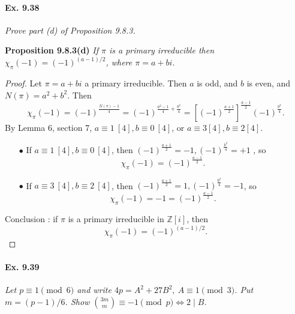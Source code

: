 \documentclass[11pt,a4paper]{article}
\newcommand{\Z}{\mathbb{Z}}
\begin{document}
\paragraph{Ex. 9.38}

{\it Prove part (d) of Proposition 9.8.3.
}

\bigskip

{\bf Proposition 9.8.3(d)} {\it 
If $\pi$ is a primary irreducible then $\chi_{\pi}(-1)=(-1)^{(a-1)/2}$, where $\pi = a+bi$.}



\begin{proof}
Let $\pi = a + bi$ a primary irreducible. Then $a$ is odd, and $b$ is even, and $N(\pi) = a^2+b^2$. 
Then 
$$\chi_\pi(-1) = (-1)^{\frac{N(\pi)-1}{4}} = (-1)^{\frac{a^2-1}{4}+ \frac{b^2}{4}} = [(-1)^{\frac{a+1}{2}}]^{\frac{a-1}{2}} (-1)^{\frac{b^2}{4}}.$$
By Lemma 6, section 7, $a\equiv 1\ [4], b\equiv 0\ [4]$, or $a \equiv 3 [4], b\equiv 2 [4]$.
\begin{enumerate}
	\item[$\bullet$] If $a\equiv 1\ [4], b\equiv 0\ [4]$, then $(-1)^{\frac{a+1}{2}} = -1, (-1)^{\frac{b^2}{4}}=+1$ , so
	$$\chi_\pi(-1) =(-1)^{\frac{a-1}{2}}.$$
	\item[$\bullet$] If $a \equiv 3 \ [4], b\equiv 2 \ [4]$, then $(-1)^{\frac{a+1}{2}} = 1, (-1)^{\frac{b^2}{4}}=-1$, so
	$$\chi_\pi(-1) =-1 = (-1)^{\frac{a-1}{2}}.$$

\end{enumerate}

Conclusion : if $\pi$ is a primary irreducible in $\Z[i]$, then
$$\chi_{\pi}(-1)=(-1)^{(a-1)/2}.$$
\end{proof} 

\paragraph{Ex. 9.39}

{\it Let $p\equiv 1 \pmod 6$ and write $4p = A^2 + 27 B^2, \ A \equiv 1 \pmod 3$. Put $m=(p-1)/6$. Show $\binom{3m}{m} \equiv -1 \pmod p \iff 2 \mid B$.
}
\end{document}
